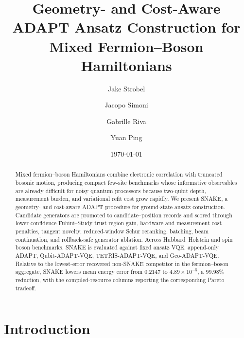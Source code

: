 \documentclass[
  reprint,
  amsmath,
  amssymb,
  aps,
  pra,
  nofootinbib,
  superscriptaddress,
  floatfix
]{revtex4-2}
\newcommand{\tentative}[1]{\textcolor{red!70!black}{#1}}
\begin{document}
\title{Geometry- and Cost-Aware ADAPT Ansatz Construction for Mixed Fermion--Boson Hamiltonians}

\author{Jake Strobel}
\author{Jacopo Simoni}
\author{Gabrille Riva}
\author{Yuan Ping}

\date{\today}


\begin{abstract}
Mixed fermion--boson Hamiltonians combine electronic correlation with truncated bosonic motion, producing compact few-site benchmarks whose informative observables are already difficult for noisy quantum processors because two-qubit depth, measurement burden, and variational refit cost grow rapidly.  We present SNAKE, a geometry- and cost-aware ADAPT procedure for ground-state ansatz construction.  Candidate generators are promoted to candidate--position records and scored through lower-confidence Fubini--Study trust-region gain, hardware and measurement cost penalties, tangent novelty, reduced-window Schur reranking, batching, beam continuation, and rollback-safe generator ablation.  Across Hubbard--Holstein and spin--boson benchmarks, SNAKE is evaluated against fixed ansatz VQE, append-only ADAPT, Qubit-ADAPT-VQE, TETRIS-ADAPT-VQE, and Geo-ADAPT-VQE.  Relative to the lowest-error recovered non-SNAKE competitor in the fermion--boson aggregate, SNAKE lowers mean energy error from \tentative{$0.2147$} to \tentative{$4.89\!\times\!10^{-5}$}, a \tentative{$99.98\%$} reduction, with the compiled-resource columns reporting the corresponding Pareto tradeoff.
\end{abstract}

\maketitle


\section{Introduction}
\end{document}
